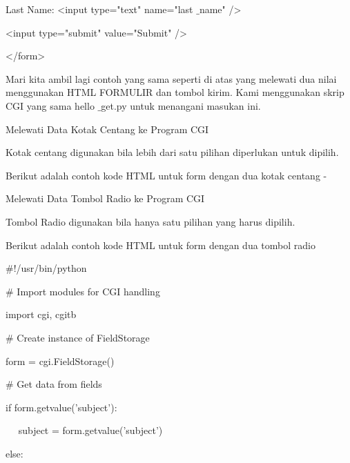 \begin{12pt}
\begin{12pt}
\begin{12pt}
\begin{12pt}
\begin{12pt}
\begin{12pt}
\begin{12pt}
\noindent 
Last Name: <input type="text" name="last $  \_  $name" /> \par
\vspace{12pt}
\noindent 
<input type="submit" value="Submit" /> \par
\noindent 
</form> \par
\vspace{12pt}
Mari kita ambil lagi contoh yang sama seperti di atas yang melewati dua nilai menggunakan HTML FORMULIR dan tombol kirim. Kami menggunakan skrip CGI yang sama hello $  \_  $get.py untuk menangani masukan ini. \par
\noindent 
Melewati Data Kotak Centang ke Program CGI \par
\vspace{12pt}
\noindent 
Kotak centang digunakan bila lebih dari satu pilihan diperlukan untuk dipilih. \par
\vspace{12pt}
\noindent 
Berikut adalah contoh kode HTML untuk form dengan dua kotak centang - \par
\vspace{12pt}
\noindent 
Melewati Data Tombol Radio ke Program CGI \par
\vspace{12pt}
\noindent 
Tombol Radio digunakan bila hanya satu pilihan yang harus dipilih. \par
\vspace{12pt}
\noindent 
Berikut adalah contoh kode HTML untuk form dengan dua tombol radio  \par
\vspace{12pt}
\vspace{12pt}
\noindent 
 $  \#  $!/usr/bin/python \par
\vspace{12pt}
\noindent 
 $  \#  $ Import modules for CGI handling  \par
\noindent 
import cgi, cgitb  \par
\vspace{12pt}
\noindent 
 $  \#  $ Create instance of FieldStorage  \par
\noindent 
form = cgi.FieldStorage()  \par
\vspace{12pt}
\noindent 
 $  \#  $ Get data from fields \par
\noindent 
if form.getvalue('subject'): \par
\noindent 
~~ subject = form.getvalue('subject') \par
\noindent 
else: \par

\end{12pt}
\end{12pt}
\end{12pt}
\end{12pt}
\end{12pt}
\end{12pt}
\end{12pt}
